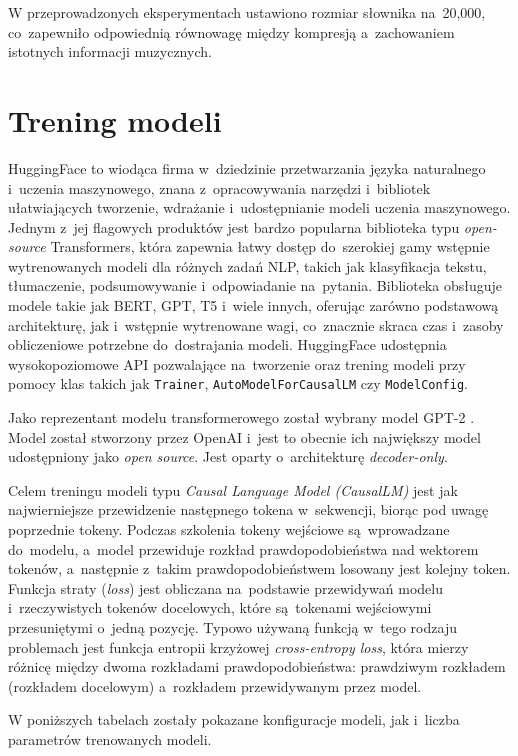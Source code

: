 \documentclass[data-science]{agh-wi} %
\begin{document}
W przeprowadzonych eksperymentach ustawiono rozmiar słownika na~20,000, co~zapewniło odpowiednią równowagę między kompresją a~zachowaniem istotnych informacji muzycznych.

\section{Trening modeli}
HuggingFace to wiodąca firma w~dziedzinie przetwarzania języka naturalnego i~uczenia maszynowego, znana z~opracowywania narzędzi i~bibliotek ułatwiających tworzenie, wdrażanie i~udostępnianie modeli uczenia maszynowego. Jednym z~jej flagowych produktów jest bardzo popularna biblioteka typu \textit{open-source} Transformers, która zapewnia łatwy dostęp do~szerokiej gamy wstępnie wytrenowanych modeli dla różnych zadań NLP, takich jak klasyfikacja tekstu, tłumaczenie, podsumowywanie i~odpowiadanie na~pytania. Biblioteka obsługuje modele takie jak BERT, GPT, T5 i~wiele innych, oferując zarówno podstawową architekturę, jak i~wstępnie wytrenowane wagi, co~znacznie skraca czas i~zasoby obliczeniowe potrzebne do~dostrajania modeli. HuggingFace udostępnia wysokopoziomowe API pozwalające na~tworzenie oraz trening modeli przy pomocy klas takich jak \texttt{Trainer}, \texttt{AutoModelForCausalLM} czy \texttt{ModelConfig}.

Jako reprezentant modelu transformerowego został wybrany model GPT-2 \cite{gpt2}. Model został stworzony przez OpenAI i~jest to obecnie ich największy model udostępniony jako \textit{open source}. Jest oparty o~architekturę \textit{decoder-only}.

Celem treningu modeli typu \textit{Causal Language Model (CausalLM)} jest jak najwierniejsze przewidzenie następnego tokena w~sekwencji, biorąc pod uwagę poprzednie tokeny. Podczas szkolenia tokeny wejściowe są~wprowadzane do~modelu, a~model przewiduje rozkład prawdopodobieństwa nad wektorem tokenów, a~następnie z~takim prawdopodobieństwem losowany jest kolejny token. Funkcja straty (\textit{loss}) jest obliczana na~podstawie przewidywań modelu i~rzeczywistych tokenów docelowych, które są~tokenami wejściowymi przesuniętymi o~jedną pozycję. Typowo używaną funkcją w~tego rodzaju problemach jest funkcja entropii krzyżowej \textit{cross-entropy loss}, która mierzy różnicę między dwoma rozkładami prawdopodobieństwa: prawdziwym rozkładem (rozkładem docelowym) a~rozkładem przewidywanym przez model.

W poniższych tabelach zostały pokazane konfiguracje modeli, jak i~liczba parametrów trenowanych modeli.
\end{document}
